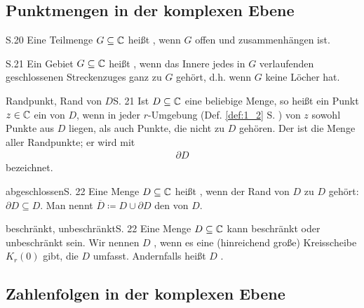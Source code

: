 \subsection{Punktmengen in der komplexen Ebene}

\begin{definition}[Gebiet]{S.20}
  Eine Teilmenge $G \subseteq \mathbb{C}$ heißt , wenn $G$ offen und zusammenhängen ist.
\end{definition}

\begin{definition}{S.21}
  Ein Gebiet $G \subseteq \mathbb{C}$ heißt , wenn das Innere jedes in $G$ verlaufenden geschlossenen Streckenzuges ganz zu $G$ gehört, d.h. wenn $G$ keine Löcher hat.
\end{definition}

\begin{bemerkung}{Randpunkt, Rand von $D$}{S. 21}
  Ist $D \subseteq \mathbb{C}$ eine beliebige Menge, so heißt ein Punkt $z \in \mathbb{C}$ ein  von $D$, wenn in jeder $r$-Umgebung (Def. \ref{def:1_2} S. \pageref{def:1_2}) von $z$ sowohl Punkte aus $D$ liegen, als auch Punkte, die nicht zu $D$ gehören.
  Der  ist die Menge aller Randpunkte; er wird mit
  \begin{align}
    \partial D
  \end{align}
  bezeichnet.
\end{bemerkung}

\begin{bemerkung}{abgeschlossen}{S. 22}
  Eine Menge $D \subseteq \mathbb{C}$ heißt , wenn der Rand von $D$ zu $D$ gehört: $\partial D \subseteq D$.
  Man nennt $\overline{D} \coloneqq D \cup \partial D$ den  von $D$.
\end{bemerkung}

\begin{bemerkung}{beschränkt, unbeschränkt}{S. 22}
  Eine Menge $D \subseteq \mathbb{C}$ kann beschränkt oder unbeschränkt sein.
  Wir nennen $D$ , wenn es eine (hinreichend große) Kreisscheibe $K_r(0)$ gibt, die $D$ umfasst.
  Andernfalls heißt $D$ .
\end{bemerkung}



\subsection{Zahlenfolgen in der komplexen Ebene}

